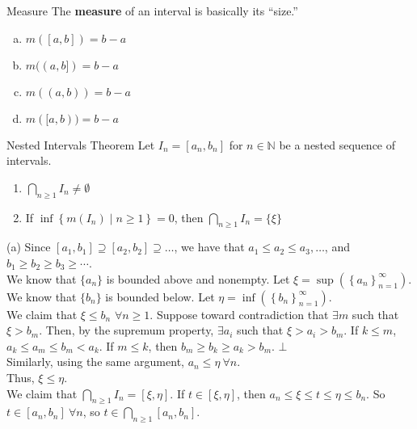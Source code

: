 \documentclass[10pt]{extarticle}
\newcommand{\N}{\mathbb{N}}
\begin{document}
  \begin{problem}{Measure}
    The \textbf{measure} of an interval is basically its ``size.''
    \begin{enumerate}[(a)]
      \item $m([a,b]) = b-a$
      \item $m((a,b]) = b-a$
      \item $m((a,b)) = b-a$
      \item $m([a,b)) = b-a$
    \end{enumerate}
  \end{problem}
  \begin{problem}{Nested Intervals Theorem}
    Let $I_n = [a_n,b_n]$ for $n\in\N$ be a nested sequence of intervals.
    \begin{enumerate}[(1)]
      \item $\bigcap_{n \geq 1}I_n \neq \emptyset$
      \item If $\inf\left\{m(I_n)\mid n\geq 1\right\} = 0$, then $\bigcap_{n\geq 1} I_n = \{\xi\}$
    \end{enumerate}
    \tcblower
    \begin{problem}{(a)}
      Since $[a_1,b_1] \supseteq [a_2,b_2] \supseteq \dots$, we have that $a_1\leq a_2\leq a_3,\dots$, and $b_1 \geq b_2 \geq b_3 \geq \cdots$.\\

      We know that $\{a_n\}$ is bounded above and nonempty. Let $\xi = \sup\left(\left\{a_n\right\}_{n=1}^{\infty}\right)$.\\

      We know that $\{b_n\}$ is bounded below. Let $\eta = \inf\left(\left\{b_n\right\}_{n=1}^{\infty}\right)$.\\

      We claim that $\xi \leq b_n$ $\forall n \geq 1$. Suppose toward contradiction that $\exists m$ such that $\xi > b_m$. Then, by the supremum property, $\exists a_i$ such that $\xi > a_i > b_m$. If $k\leq m$, $a_k \leq a_m \leq b_m < a_k$. If $m \leq k$, then $b_m \geq b_k \geq a_k > b_m$. $\bot$\\

      Similarly, using the same argument, $a_n \leq \eta~\forall n$.\\

      Thus, $\xi \leq \eta$.\\

      We claim that $\bigcap_{n\geq 1} I_n = [\xi,\eta]$. If $t\in [\xi,\eta]$, then $a_n \leq \xi \leq t \leq \eta \leq b_n$. So $t\in [a_n,b_n]~\forall n$, so $t\in \bigcap_{n\geq 1} [a_n,b_n]$.\\


\end{problem}
\end{problem}
\end{document}
